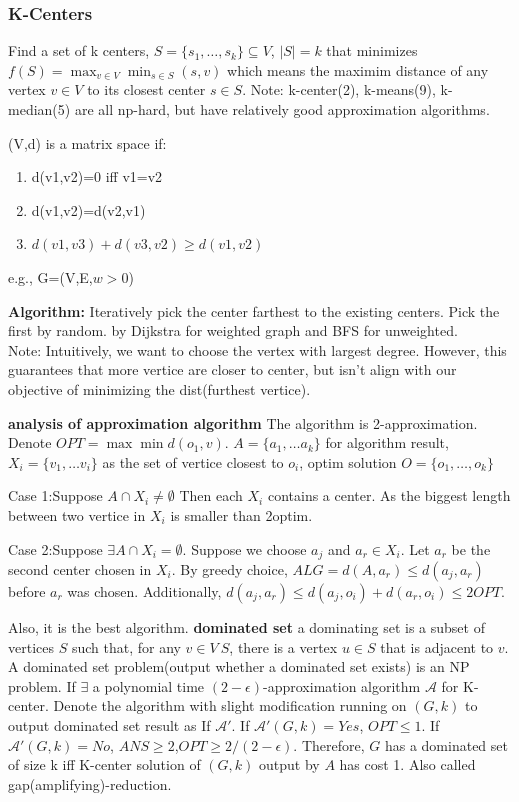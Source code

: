 \subsubsection{K-Centers}
Find a set of k centers, $S=\{s_1,\ldots ,s_k\} \subseteq V$, $|S|=k$ that minimizes $f(S)=\max_{v \in V} \min_{s \in S} (s,v)$ which means the maximim distance of any vertex $v \in V$ to its closest center $s\in S$.
Note: k-center(2), k-means(9), k-median(5) are all np-hard, but have relatively good approximation algorithms.
\begin{remark}
    (V,d) is a matrix space if:
    \begin{enumerate}
        \item d(v1,v2)=0 iff v1=v2
        \item d(v1,v2)=d(v2,v1)
        \item $d(v1,v3)+d(v3,v2)\geq d(v1,v2)$
    \end{enumerate}
    e.g., G=(V,E,$w>0$)
\end{remark}
\textbf{Algorithm:} Iteratively pick the center farthest to the existing centers. Pick the first by random. by Dijkstra for weighted graph and BFS for unweighted.\\
Note: Intuitively, we want to choose the vertex with largest degree. However, this guarantees that more vertice are closer to center,
but isn't align with our objective of minimizing the dist(furthest vertice).\\
\begin{algorithm}
\end{algorithm}
\textbf{analysis of approximation algorithm}
The algorithm is 2-approximation.
Denote $OPT=\max \min d(o_1,v)$. $A=\{a_1,\ldots a_k\}$ for algorithm result, $X_i=\{v_1,\ldots v_i\}$ as the set of vertice closest to $o_i$, optim solution $O=\{o_1,\ldots, o_k\}$

Case 1:Suppose $A\cap X_i \neq \emptyset$ Then each $X_i$ contains a center. As the biggest length between two vertice in $X_i$ is smaller than 2optim.

Case 2:Suppose $\exists A \cap X_i =\emptyset$. Suppose we choose $a_j$ and $a_r\in X_i$. Let $a_r$ be the second center chosen in $X_i$.
By greedy choice, $ALG=d(A,a_r)\leq d(a_j,a_r)$ before $a_r$ was chosen. Additionally, $d(a_j,a_r)\leq d(a_j,o_i)+d(a_r,o_i)\leq 2OPT$.


Also, it is the best algorithm.
\textbf{dominated set} a dominating set is a
subset of vertices $S$ such that, for any $v \in V \ S$, there is a
vertex $u \in S$ that is adjacent to $v$.
A dominated set problem(output whether a dominated set exists) is an NP problem.
If $\exists$ a polynomial time $(2-\epsilon)$-approximation algorithm $\mathcal{A} $ for K-center. Denote the algorithm with slight modification running on $(G,k)$ to output dominated set result as If $\mathcal{A'}$.
If $\mathcal{A'}(G,k)=Yes$, $OPT\leq 1$. If $\mathcal{A'}(G,k)=No$, $ANS\geq 2$,$OPT \geq 2/(2-\epsilon)$.
Therefore, $G$ has a dominated set of size k iff K-center solution of $(G,k)$ output by $A$ has cost 1.
Also called gap(amplifying)-reduction.

